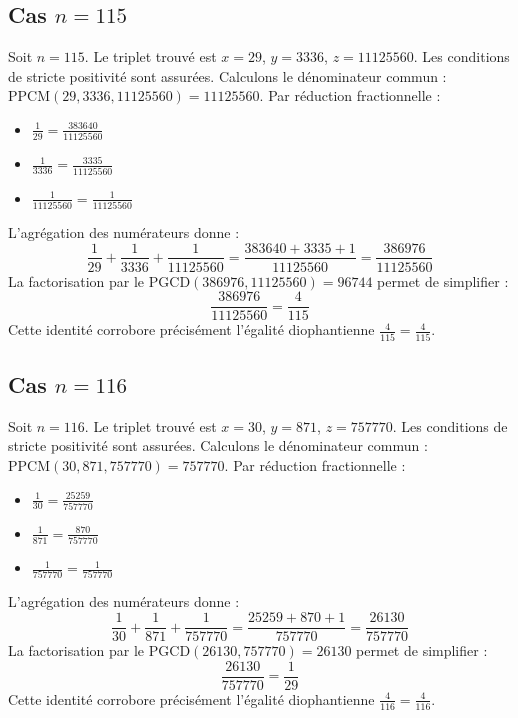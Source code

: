 \documentclass[11pt,a4paper]{article}
\begin{document}
\subsection{Cas $n = 115$}
Soit $n = 115$. Le triplet trouvé est $x = 29$, $y = 3336$, $z = 11125560$.
Les conditions de stricte positivité sont assurées.
Calculons le dénominateur commun : $\text{PPCM}(29, 3336, 11125560) = 11125560$.
Par réduction fractionnelle :
\begin{itemize}
    \item $\frac{1}{29} = \frac{383640}{11125560}$
    \item $\frac{1}{3336} = \frac{3335}{11125560}$
    \item $\frac{1}{11125560} = \frac{1}{11125560}$
\end{itemize}
L'agrégation des numérateurs donne :
$$ \frac{1}{29} + \frac{1}{3336} + \frac{1}{11125560} = \frac{383640 + 3335 + 1}{11125560} = \frac{386976}{11125560} $$
La factorisation par le $\text{PGCD}(386976, 11125560) = 96744$ permet de simplifier :
$$ \frac{386976}{11125560} = \frac{4}{115} $$
Cette identité corrobore précisément l'égalité diophantienne $\frac{4}{115} = \frac{4}{115}$.

\subsection{Cas $n = 116$}
Soit $n = 116$. Le triplet trouvé est $x = 30$, $y = 871$, $z = 757770$.
Les conditions de stricte positivité sont assurées.
Calculons le dénominateur commun : $\text{PPCM}(30, 871, 757770) = 757770$.
Par réduction fractionnelle :
\begin{itemize}
    \item $\frac{1}{30} = \frac{25259}{757770}$
    \item $\frac{1}{871} = \frac{870}{757770}$
    \item $\frac{1}{757770} = \frac{1}{757770}$
\end{itemize}
L'agrégation des numérateurs donne :
$$ \frac{1}{30} + \frac{1}{871} + \frac{1}{757770} = \frac{25259 + 870 + 1}{757770} = \frac{26130}{757770} $$
La factorisation par le $\text{PGCD}(26130, 757770) = 26130$ permet de simplifier :
$$ \frac{26130}{757770} = \frac{1}{29} $$
Cette identité corrobore précisément l'égalité diophantienne $\frac{4}{116} = \frac{4}{116}$.
\end{document}

